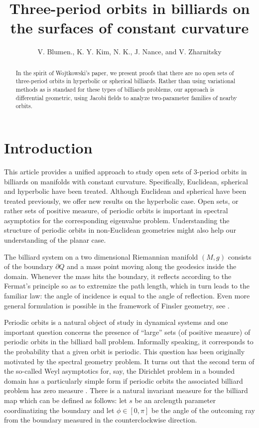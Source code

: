 \documentclass[11pt]{article}
\theoremstyle{plain}
\theoremstyle{definition}
\begin{document}
\title{Three-period orbits in billiards on the surfaces of constant curvature}
\author{V. Blumen., K. Y. Kim, N. K., J. Nance, and V. Zharnitsky}
\maketitle

\begin{abstract}
In the spirit of Wojtkowski's paper, we present proofs that there are no open sets of three-period orbits in hyperbolic
 or spherical billiards. Rather than using variational methods as is standard for these types of billiards problems,
 our approach is differential geometric, using Jacobi fields to analyze two-parameter families of nearby orbits.
\end{abstract}
\tableofcontents
\section{Introduction}
This article provides a unified approach to study open sets of 3-period orbits in billiards on manifolds with constant curvature. Specifically, Euclidean, spherical and hyperbolic have been treated. Although Euclidean and spherical have been treated previously, we offer new results on the hyperbolic case. Open sets, or rather sets of positive measure, of periodic orbits is important in spectral asymptotics for the corresponding eigenvalue problem. Understanding the structure of periodic orbits in non-Euclidean geometries might also help our understanding of the planar case.

The billiard system on a two dimensional Riemannian manifold $(M,g)$ consists of the boundary $\partial Q$ and
a mass point moving along the geodesics inside the domain. Whenever the mass hits the boundary, it reflects
according to the Fermat's principle so as to extremize the path length, which in turn leads to the familiar law:
the angle of incidence  is equal to the angle of reflection. Even more general formulation is possible in the
framework  of Finsler geometry, see \cite{tabachnikov_finsler}.

Periodic orbits is a natural object of study in dynamical systems and one important question concerns
the presence of ``large'' sets (of positive measure) of periodic orbits in the billiard ball problem. Informally speaking,
it corresponds to the probability that a given orbit is periodic.
This question has been originally motivated by the spectral geometry problem. It turns out that the second term
of the so-called Weyl asymptotics for, say, the Dirichlet problem in a bounded domain has a particularly simple
 form if periodic orbits the associated billiard problem has zero measure \cite{ivrii}. There is a natural invariant
 measure for the billiard map which can be defined as follows:
let $s$ be an arclength parameter coordinatizing the boundary and let
$\phi \in [0,\pi]$ be the angle of the outcoming ray from the boundary measured in the counterclockwise direction.
\end{document}
